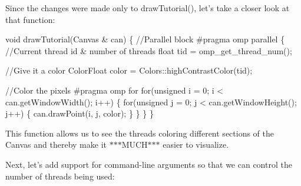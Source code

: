 Since the changes were made only to {\ttfamily draw\-Tutorial()}, let's take a closer look at that function\-:


\begin{DoxyCode}
\textcolor{keywordtype}{void} drawTutorial(Canvas & can) \{
  \textcolor{comment}{//Parallel block}
\textcolor{preprocessor}{  #pragma omp parallel}
\textcolor{preprocessor}{}  \{
    \textcolor{comment}{//Current thread id & number of threads}
    \textcolor{keywordtype}{float} tid = omp\_get\_thread\_num();

    \textcolor{comment}{//Give it a color}
    ColorFloat color = Colors::highContrastColor(tid);

    \textcolor{comment}{//Color the pixels}
\textcolor{preprocessor}{    #pragma omp for}
\textcolor{preprocessor}{}    \textcolor{keywordflow}{for}(\textcolor{keywordtype}{unsigned} i = 0; i < can.getWindowWidth(); i++) \{
        \textcolor{keywordflow}{for}(\textcolor{keywordtype}{unsigned} j = 0; j < can.getWindowHeight(); j++) \{
            can.drawPoint(i, j, color);
          \}
    \}
  \}
\}
\end{DoxyCode}


This function allows us to see the threads coloring different sections of the Canvas and thereby make it $\ast$$\ast$$\ast$\-M\-U\-C\-H$\ast$$\ast$$\ast$ easier to visualize.

Next, let's add support for command-\/line arguments so that we can control the number of threads being used\-:


